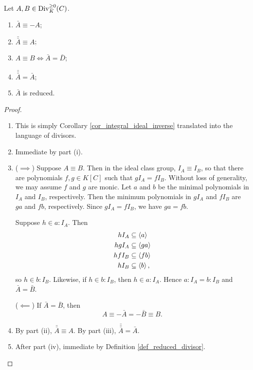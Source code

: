 \begin{proposition}
  \label{prop_flip_properties}
  Let $A, B \in \operatorname{Div}_K^{\geq 0}(C)$.
  \begin{enumerate}[label=(\roman*)]
    \item $\bar A \equiv -A$;
    \item $\bar{\bar A} \equiv A$;
    \item $A \equiv B \iff \bar A = \bar D$;
    \item $\bar{\bar{\bar A}} = \bar A$;
    \item $\bar A$ is reduced.
  \end{enumerate}
\end{proposition}
\begin{proof}
  \begin{enumerate}[label=(\roman*)]
    \item This is simply Corollary \ref{cor_integral_ideal_inverse} translated into the language of divisors.
    \item Immediate by part (i).
    \item
      ($\implies$)
      Suppose $A \equiv B$.
      Then in the ideal class group, $I_A \equiv I_B$,
      so that there are polynomials $f, g \in K[C]$ such that $gI_A = fI_B$.
      Without loss of generality, we may assume $f$ and $g$ are monic.
      Let $a$ and $b$ be the minimal polynomials in $I_A$ and $I_B$, respectively.
      Then the minimum polynomials in $gI_A$ and $fI_B$ are $ga$ and $fb$, respectively.
      Since $gI_A = fI_B$, we have $ga = fb$.
      
      Suppose $h \in a : I_A$. Then
      \begin{align*}
        hI_A &\subseteq \left\langle a \right\rangle \\
        hgI_A &\subseteq \left\langle ga \right\rangle \\
        hfI_B &\subseteq \left\langle fb \right\rangle \\
        hI_B &\subseteq \left\langle b \right\rangle,
      \end{align*}
      so $h \in b : I_B$.
      Likewise, if $h \in b : I_B$, then $h \in a : I_A$.
      Hence $a : I_A = b : I_B$ and $\bar A = \bar B$.
      
      ($\impliedby$)
      If $\bar A = \bar B$, then
      \[ A \equiv - \bar A = - \bar B \equiv B. \]
    \item By part (ii), $\bar{\bar A} \equiv A$.
          By part (iii), $\bar{\bar{\bar A}} = \bar A$.
    \item After part (iv), immediate by Definition \ref{def_reduced_divisor}.
  \end{enumerate}
\end{proof}

